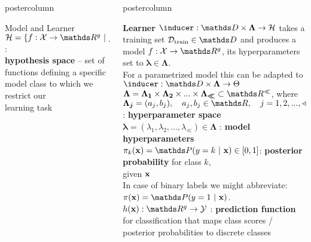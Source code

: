 \documentclass{beamer}
\newlength{\columnheight} %
\begin{document}
\begin{frame}[fragile]{}
\begin{columns}
\begin{column}{.31\textwidth}
\begin{beamercolorbox}[center]{postercolumn}
\begin{minipage}{.98\textwidth}
{\begin{myblock}{Model and Learner}
$\Hspace = \{f : \Xspace \rightarrow \R^g ~|~ f \text{ belongs to a certain functional family}\}$ : \\ \textbf{hypothesis space} -- set of functions defining a specific model class to which we restrict our \\
learning task 					
\end{myblock}\vfill
				}
			\end{minipage}
		\end{beamercolorbox}
	\end{column}
	\begin{column}{.31\textwidth}
		\begin{beamercolorbox}[center]{postercolumn}
			\begin{minipage}{.98\textwidth}
				\parbox[t][\columnheight]{\textwidth}{
\begin{myblock}{} \vspace{-4ex}
\textbf{Learner }$\inducer: \preimageInducerShort \rightarrow \Hspace$  takes a training set  $\Dtrain \in \allDatasets$  and produces a model $f : \Xspace \rightarrow \R^g$, its hyperparameters set to $\bm{\lambda} \in \bm{\Lambda}$.\\
For a parametrized model this can be adapted to $\inducer: \preimageInducerShort \rightarrow \Theta$ \\

$\bm{\Lambda} = \bm{\Lambda_1} \times \bm{\Lambda_2} \times ... \times \bm{\Lambda_{\ll}} \subset \R^{\ll}$, where $\bm{\Lambda_j} = (a_j, b_j), \quad a_j, b_j \in \R, \quad j = 1, 2, ... , \ll$: \textbf{hyperparameter space} \\

$\bm{\lambda} = (\lambda_1, \lambda_2, ..., \lambda_{\ll}) \in \bm{\Lambda}$ : \textbf{model hyperparameters} \\

$\pikx = \postk \in [0, 1]$: \textbf{posterior probability} for class $k$, \\ given $\mathbf{x}$ \\
In case of binary labels we might abbreviate: $\pix = \post$. \\

$\hx: \R^g \rightarrow \Yspace$ : \textbf{prediction function} for classification that maps class scores / posterior probabilities to discrete classes \\


\end{myblock}}
\end{minipage}
\end{beamercolorbox}
\end{column}
\end{columns}
\end{frame}
\end{document}

